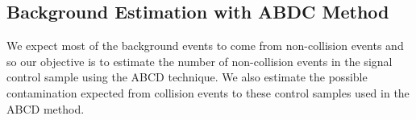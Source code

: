 \subsection{Background Estimation with ABDC Method}
We expect most of the background events to come from non-collision events and so our objective is to estimate the number of non-collision events in the signal control sample using the \textsf{ABCD} technique. We also estimate the possible contamination expected from collision events to these control samples used in the \textsf{ABCD} method.

